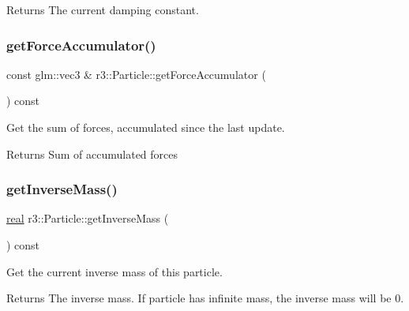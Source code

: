 \begin{DoxyReturn}{Returns}
The current damping constant. 
\end{DoxyReturn}
\mbox{\label{classr3_1_1_particle_a81fe0cfac976df7da6337dabc8f73313}} 
\subsubsection{\texorpdfstring{get\+Force\+Accumulator()}{getForceAccumulator()}}
{\footnotesize\ttfamily const glm\+::vec3 \& r3\+::\+Particle\+::get\+Force\+Accumulator (\begin{DoxyParamCaption}{ }\end{DoxyParamCaption}) const}



Get the sum of forces, accumulated since the last update. 

\begin{DoxyReturn}{Returns}
Sum of accumulated forces 
\end{DoxyReturn}
\mbox{\label{classr3_1_1_particle_a6924e65c0aacb7e50057e43be134156b}} 
\subsubsection{\texorpdfstring{get\+Inverse\+Mass()}{getInverseMass()}}
{\footnotesize\ttfamily \mbox{\hyperlink{namespacer3_ab2016b3e3f743fb735afce242f0dc1eb}{real}} r3\+::\+Particle\+::get\+Inverse\+Mass (\begin{DoxyParamCaption}{ }\end{DoxyParamCaption}) const}



Get the current inverse mass of this particle. 

\begin{DoxyReturn}{Returns}
The inverse mass. If particle has infinite mass, the inverse mass will be 0. 
\end{DoxyReturn}
\mbox{\label{classr3_1_1_particle_ade86b59933d1acc8d33f79a8735d8f3d}} 
